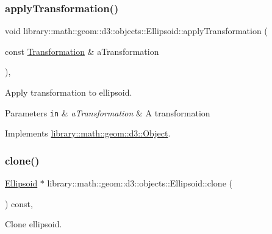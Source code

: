 \subsubsection{\texorpdfstring{apply\+Transformation()}{applyTransformation()}}
{\footnotesize\ttfamily void library\+::math\+::geom\+::d3\+::objects\+::\+Ellipsoid\+::apply\+Transformation (\begin{DoxyParamCaption}\item[{const \hyperlink{classlibrary_1_1math_1_1geom_1_1d3_1_1_transformation}{Transformation} \&}]{a\+Transformation }\end{DoxyParamCaption})\hspace{0.3cm}{\ttfamily [override]}, {\ttfamily [virtual]}}



Apply transformation to ellipsoid. 


\begin{DoxyParams}[1]{Parameters}
\mbox{\tt in}  & {\em a\+Transformation} & A transformation \\
\hline
\end{DoxyParams}


Implements \hyperlink{classlibrary_1_1math_1_1geom_1_1d3_1_1_object_a5fc47b1ee5d9a28efc6010d3d1512470}{library\+::math\+::geom\+::d3\+::\+Object}.

\mbox{\label{classlibrary_1_1math_1_1geom_1_1d3_1_1objects_1_1_ellipsoid_a8982455e000708f1b7e4caf728e7ad40}} 
\subsubsection{\texorpdfstring{clone()}{clone()}}
{\footnotesize\ttfamily \hyperlink{classlibrary_1_1math_1_1geom_1_1d3_1_1objects_1_1_ellipsoid}{Ellipsoid} $\ast$ library\+::math\+::geom\+::d3\+::objects\+::\+Ellipsoid\+::clone (\begin{DoxyParamCaption}{ }\end{DoxyParamCaption}) const\hspace{0.3cm}{\ttfamily [override]}, {\ttfamily [virtual]}}



Clone ellipsoid. 

